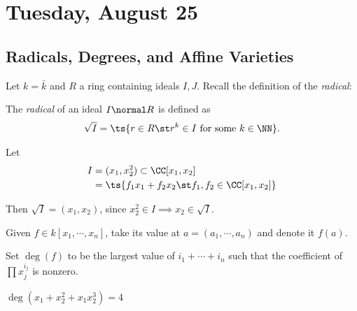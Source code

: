 \hypertarget{tuesday-august-25}{%
\section{Tuesday, August 25}\label{tuesday-august-25}}

\hypertarget{radicals-degrees-and-affine-varieties}{%
\subsection{Radicals, Degrees, and Affine
Varieties}\label{radicals-degrees-and-affine-varieties}}

Let \(k = \bar k\) and \(R\) a ring containing ideals \(I, J\). Recall
the definition of the \emph{radical}:

\begin{definition}[Radical]

The \emph{radical} of an ideal \(I \normal R\) is defined as
\begin{align*}  
\sqrt{I} = \ts{r\in R \st r^k\in I \text{ for some } k\in \NN}
.\end{align*}

\end{definition}

\begin{example}

Let
\begin{align*}
I &= (x_1, x_2^2) \subset \CC[x_1, x_2] \\
  &= \ts{ f_1 x_1 + f_2 x_2 \st f_1, f_2 \in \CC[x_1, x_2]}
\end{align*}

Then \(\sqrt{I} = (x_1, x_2)\), since
\(x_2^2 \in I \implies x_2 \in \sqrt{I}\).

\end{example}

Given \(f\in k[x_1, \cdots, x_n]\), take its value at
\(a = (a_1, \cdots, a_n)\) and denote it \(f(a)\).

\begin{definition}

Set \(\deg(f)\) to be the largest value of \(i_1 + \cdots + i_n\) such
that the coefficient of \(\prod x_j ^{i_j}\) is nonzero.

\end{definition}

\begin{example}

\(\deg(x_1 + x_2^2 + x_1 x_2^3) = 4\)

\end{example}

